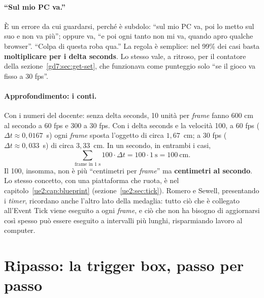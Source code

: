 \paragraph{``Sul mio PC va.''} È un errore da cui guardarsi, perché è
subdolo: ``sul mio PC va, poi lo metto sul suo e non va più''; oppure va,
``e poi ogni tanto non mi va, quando apro qualche browser''. ``Colpa di
questa roba qua.'' La regola è semplice: nel 99\% dei casi basta
\textbf{moltiplicare per i delta seconds}. Lo stesso vale, a ritroso, per il
contatore della sezione~\ref{gd7:sec:get-set}, che funzionava come punteggio
solo ``se il gioco va fisso a 30 fps''.

\paragraph{Approfondimento: i conti.} Con i numeri del docente: senza delta
seconds, 10 unità per \emph{frame} fanno 600 cm al secondo a 60 fps e 300 a
30 fps. Con i delta seconds e la velocità 100, a 60 fps ($\Delta t \approx
0{,}0167$~s) ogni \emph{frame} sposta l'oggetto di circa $1{,}67$~cm; a 30 fps
($\Delta t \approx 0{,}033$~s) di circa $3{,}33$~cm. In un secondo, in
entrambi i casi,
\[
  \sum_{\text{frame in 1 s}} 100 \cdot \Delta t = 100 \cdot 1~\text{s}
  = 100~\text{cm}.
\]
Il 100, insomma, non è più ``centimetri per \emph{frame}'' ma
\textbf{centimetri al secondo}. Lo stesso concetto, con una piattaforma che
ruota, è nel capitolo~\ref{ue2:cap:blueprint} (sezione~\ref{ue2:sec:tick}).
Romero e Sewell, presentando i \emph{timer}, ricordano anche l'altro lato della
medaglia: tutto ciò che è collegato all'Event Tick viene eseguito a ogni
\emph{frame}, e ciò che non ha bisogno di aggiornarsi così spesso può essere
eseguito a intervalli più lunghi, risparmiando lavoro al computer.

\section{Ripasso: la trigger box, passo per passo}
\label{gd7:sec:ripasso}

